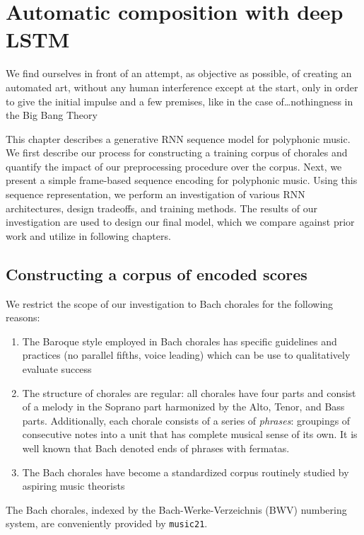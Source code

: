 \chapter{Automatic composition with deep LSTM}
\begin{savequote}[75mm]
  We find ourselves in front of an attempt, as objective as possible, of creating
  an automated art, without any human interference except at the start, only in
  order to give the initial impulse and a few premises, like in the case
  of\ldots nothingness in the Big Bang Theory
\end{savequote}
\ifpdf
    \graphicspath{{Chapter4/Figs/Raster/}{Chapter4/Figs/PDF/}{Chapter4/Figs/}}
\else
    \graphicspath{{Chapter4/Figs/Vector/}{Chapter4/Figs/}}
\fi

This chapter describes a generative RNN sequence model for polyphonic music. We
first describe our process for constructing a training corpus of chorales and
quantify the impact of our preprocessing procedure over the corpus. Next, we
present a simple frame-based sequence encoding for polyphonic music. Using this
sequence representation, we perform an investigation of various RNN
architectures, design tradeoffs, and training methods. The results of our
investigation are used to design our final model, which we compare against
prior work and utilize in following chapters.

\section{Constructing a corpus of encoded scores}

We restrict the scope of our investigation to Bach chorales for the following reasons:
\begin{enumerate}
  \item The Baroque style employed in Bach chorales has specific guidelines and
    practices \citep{piston1978harmony} (\eg no parallel fifths, voice leading)
    which can be use to qualitatively evaluate success
  \item The structure of chorales are regular: all chorales have four parts and
    consist of a melody in the Soprano part harmonized by the Alto, Tenor, and
    Bass parts. Additionally, each chorale consists of a series of \emph{phrases}:
    groupings of consecutive notes into a unit that has complete musical sense
    of its own\citep{nattiez1990music}. It is well known that Bach
    denoted ends of phrases with fermatas.
  \item The Bach chorales have become a standardized corpus routinely studied
    by aspiring music theorists\citep{white2002guidelines}
\end{enumerate}
The Bach chorales, indexed by the Bach-Werke-Verzeichnis (BWV) numbering
system\citep{butt1999bach}, are conveniently provided by
\texttt{music21}\citep{Scott2015}.

